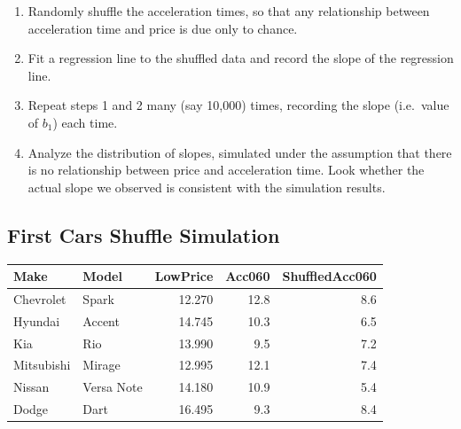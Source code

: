 \documentclass[]{book}
\newenvironment{Shaded}{\begin{snugshade}}{\end{snugshade}}
\newcommand{\KeywordTok}[1]{\textcolor[rgb]{0.13,0.29,0.53}{\textbf{#1}}}
\newcommand{\DecValTok}[1]{\textcolor[rgb]{0.00,0.00,0.81}{#1}}
\newcommand{\StringTok}[1]{\textcolor[rgb]{0.31,0.60,0.02}{#1}}
\newcommand{\OperatorTok}[1]{\textcolor[rgb]{0.81,0.36,0.00}{\textbf{#1}}}
\newcommand{\NormalTok}[1]{#1}
\begin{document}
\begin{enumerate}
\def\labelenumi{\arabic{enumi}.}
\item
  Randomly shuffle the acceleration times, so that any relationship
  between acceleration time and price is due only to chance.
\item
  Fit a regression line to the shuffled data and record the slope of the
  regression line.
\item
  Repeat steps 1 and 2 many (say 10,000) times, recording the slope
  (i.e.~value of \(b_1\)) each time.\\
\item
  Analyze the distribution of slopes, simulated under the assumption
  that there is no relationship between price and acceleration time.
  Look whether the actual slope we observed is consistent with the
  simulation results.
\end{enumerate}

\subsection{First Cars Shuffle
Simulation}\label{first-cars-shuffle-simulation}

\begin{Shaded}
\end{Shaded}

\begin{tabular}{l|l|r|r|r}
\hline
Make & Model & LowPrice & Acc060 & ShuffledAcc060\\
\hline
Chevrolet & Spark & 12.270 & 12.8 & 8.6\\
\hline
Hyundai & Accent & 14.745 & 10.3 & 6.5\\
\hline
Kia & Rio & 13.990 & 9.5 & 7.2\\
\hline
Mitsubishi & Mirage & 12.995 & 12.1 & 7.4\\
\hline
Nissan & Versa Note & 14.180 & 10.9 & 5.4\\
\hline
Dodge & Dart & 16.495 & 9.3 & 8.4\\
\hline
\end{tabular}
\end{document}
